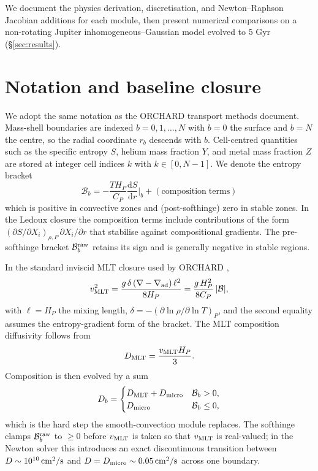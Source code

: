 \documentclass{aastex631}
\newcommand{\dd}{\mathrm{d}}
\newcommand{\Hp}{H_P}
\newcommand{\Cp}{C_P}
\newcommand{\Vmlt}{v_{\rm MLT}}
\newcommand{\Dmlt}{D_{\rm MLT}}
\newcommand{\Dmicro}{D_{\rm micro}}
\newcommand{\bracketraw}{\mathcal{B}^{\rm raw}}
\newcommand{\bracketb}{\mathcal{B}}
\begin{document}
We document the physics derivation, discretisation, and Newton--Raphson
Jacobian additions for each module, then present numerical comparisons
on a non-rotating Jupiter inhomogeneous--Gaussian model evolved to $5$
Gyr (\S\ref{sec:results}).

\section{Notation and baseline closure}\label{sec:notation}

We adopt the same notation as the ORCHARD transport methods document.
Mass-shell boundaries are indexed $b = 0, 1, \ldots, N$ with $b = 0$
the surface and $b = N$ the centre, so the radial coordinate $r_b$
descends with $b$.  Cell-centred quantities such as the
specific entropy $S$, helium mass fraction $Y$, and metal mass
fraction $Z$ are stored at integer cell indices $k$ with
$k \in [0, N-1]$.  We denote the entropy bracket
\begin{equation}
\bracketb{}_b
    = -\frac{T H_P}{\Cp} \frac{\dd S}{\dd r}\bigg|_b
      + \mathrm{(composition\;terms)}
    \label{eq:bracket-defn}
\end{equation}
which is positive in convective zones and (post-softhinge) zero in
stable zones.  In the Ledoux closure the composition terms include
contributions of the form $(\partial S/\partial X_i)_{\rho,P}\,
\partial X_i/\partial r$ that stabilise against compositional
gradients.  The pre-softhinge bracket $\bracketraw_b$ retains its
sign and is generally negative in stable regions.

In the standard inviscid MLT closure used by ORCHARD
\citep[Eq.~11 of][]{TejadaArevalo2026orchard},
\begin{equation}
\Vmlt^2
   = \frac{g\,\delta\,(\nabla - \nabla_{\rm ad})\,\ell^2}{8 \Hp}
   = \frac{g\,\Hp^2}{8\Cp}\,|\bracketb|,
   \label{eq:vmlt}
\end{equation}
with $\ell = \Hp$ the mixing length, $\delta = -(\partial \ln \rho/
\partial \ln T)_P$, and the second equality assumes the entropy-gradient
form of the bracket.  The MLT composition diffusivity follows from
\begin{equation}
\Dmlt = \frac{\Vmlt \Hp}{3}.
\label{eq:Dmlt}
\end{equation}
Composition is then evolved by a sum
\begin{equation}
D_b = \begin{cases}
\Dmlt + \Dmicro & \bracketb{}_b > 0,\\
\Dmicro & \bracketb{}_b \le 0,
\end{cases}
\label{eq:Db-default}
\end{equation}
which is the hard step the smooth-convection module replaces.  The
softhinge \citep[\S2.5 of][]{TejadaArevalo2026orchard} clamps
$\bracketraw_b$ to $\ge 0$ before $\Vmlt$ is taken so that $\Vmlt$ is
real-valued; in the Newton solver this introduces an exact
discontinuous transition between $D \sim 10^{10}\,\rm cm^2/s$ and
$D = \Dmicro \sim 0.05\,\rm cm^2/s$ across one boundary.
\end{document}
